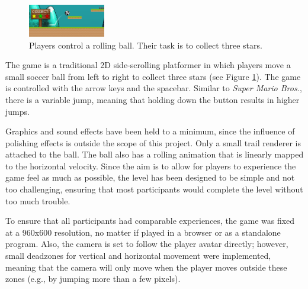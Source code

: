 \begin{figure}[htbp]
\centering
\includegraphics[width=0.3\textwidth]{Pics/gf}
\caption{Players control a rolling ball. Their task is to collect three stars.}
\label{fig:game}
\end{figure}

The game is a traditional 2D side-scrolling platformer in which players move a small soccer ball from left to right to collect three stars (see Figure \ref{fig:game}). The game is controlled with the arrow keys and the spacebar. Similar to \textit{Super Mario Bros.}, there is a variable jump, meaning that holding down the button results in higher jumps.

Graphics and sound effects have been held to a minimum, since the influence of polishing effects is outside the scope of this project. Only a small trail renderer is attached to the ball. The ball also has a rolling animation that is linearly mapped to the horizontal velocity. Since the aim is to allow for players to experience the game feel as much as possible, the level has been designed to be simple and not too challenging, ensuring that most participants would complete the level without too much trouble.

To ensure that all participants had comparable experiences, the game was fixed at a 960x600 resolution, no matter if played in a browser or as a standalone program. Also, the camera is set to follow the player avatar directly; however, small deadzones for vertical and horizontal movement were implemented, meaning that the camera will only move when the player moves outside these zones (e.g., by jumping more than a few pixels).